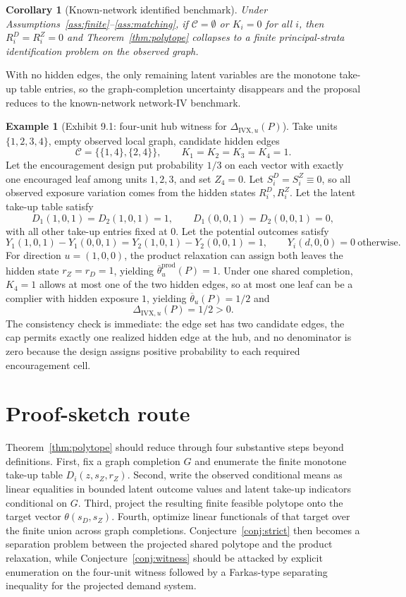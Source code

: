 \documentclass[11pt]{article}
\theoremstyle{definition}
\newtheorem{example}{Example}
\theoremstyle{plain}
\newtheorem{corollary}{Corollary}
\theoremstyle{remark}
\begin{document}
\begin{corollary}[Known-network identified benchmark]\label{cor:known}
Under Assumptions~\ref{ass:finite}--\ref{ass:matching}, if \(\mathcal C=\emptyset\) or \(K_i=0\) for all \(i\), then \(R_i^D=R_i^Z=0\) and Theorem~\ref{thm:polytope} collapses to a finite principal-strata identification problem on the observed graph.
\end{corollary}
With no hidden edges, the only remaining latent variables are the monotone take-up table entries, so the graph-completion uncertainty disappears and the proposal reduces to the known-network network-IV benchmark.

\begin{example}[Exhibit 9.1: four-unit hub witness for \(\Delta_{\mathrm{IVX},u}(P)\)]\label{ex:hub}
Take units \(\{1,2,3,4\}\), empty observed local graph, candidate hidden edges
\[
\mathcal C=\{\{1,4\},\{2,4\}\},
\qquad
K_1=K_2=K_3=K_4=1.
\]
Let the encouragement design put probability \(1/3\) on each vector with exactly one encouraged leaf among units \(1,2,3\), and set \(Z_4=0\). Let \(S_i^D=S_i^Z\equiv 0\), so all observed exposure variation comes from the hidden states \(R_i^D,R_i^Z\). Let the latent take-up table satisfy
\[
D_1(1,0,1)=D_2(1,0,1)=1,\qquad D_1(0,0,1)=D_2(0,0,1)=0,
\]
with all other take-up entries fixed at \(0\). Let the potential outcomes satisfy
\[
Y_1(1,0,1)-Y_1(0,0,1)=Y_2(1,0,1)-Y_2(0,0,1)=1,
\qquad
Y_i(d,0,0)=0\ \text{otherwise}.
\]
For direction \(u=(1,0,0)\), the product relaxation can assign both leaves the hidden state \(r_Z=r_D=1\), yielding \(\overline\theta^{\mathrm{prod}}_u(P)=1\). Under one shared completion, \(K_4=1\) allows at most one of the two hidden edges, so at most one leaf can be a complier with hidden exposure \(1\), yielding \(\overline\theta_u(P)=1/2\) and
\[
\Delta_{\mathrm{IVX},u}(P)=1/2>0.
\]
The consistency check is immediate: the edge set has two candidate edges, the cap permits exactly one realized hidden edge at the hub, and no denominator is zero because the design assigns positive probability to each required encouragement cell.
\end{example}

\section{Proof-sketch route}
Theorem~\ref{thm:polytope} should reduce through four substantive steps beyond definitions. First, fix a graph completion \(G\) and enumerate the finite monotone take-up table \(D_i(z,s_Z,r_Z)\). Second, write the observed conditional means as linear equalities in bounded latent outcome values and latent take-up indicators conditional on \(G\). Third, project the resulting finite feasible polytope onto the target vector \(\theta(s_D,s_Z)\). Fourth, optimize linear functionals of that target over the finite union across graph completions. Conjecture~\ref{conj:strict} then becomes a separation problem between the projected shared polytope and the product relaxation, while Conjecture~\ref{conj:witness} should be attacked by explicit enumeration on the four-unit witness followed by a Farkas-type separating inequality for the projected demand system.
\end{document}
